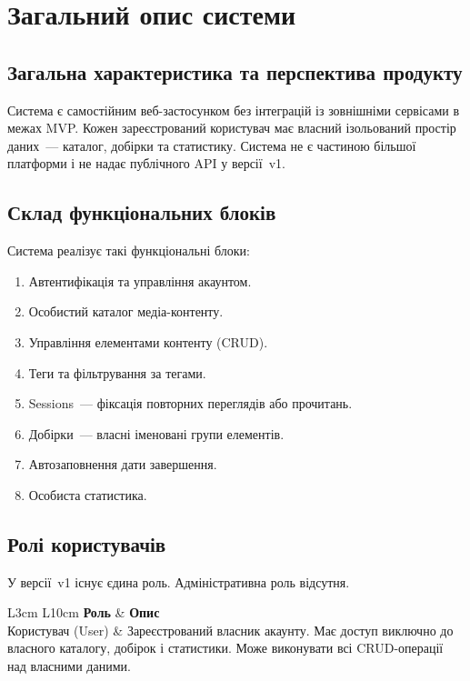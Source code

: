 \section{Загальний опис системи}
\label{sec:zahalnyi-opys}

\subsection{Загальна характеристика та перспектива продукту}

Система є самостійним веб-застосунком без інтеграцій із зовнішніми сервісами в межах MVP. Кожен зареєстрований користувач має власний ізольований простір даних~--- каталог, добірки та статистику. Система не є частиною більшої платформи і не надає публічного API у версії~v1. 

\subsection{Склад функціональних блоків}

Система реалізує такі функціональні блоки:
\begin{enumerate}
  \item Автентифікація та управління акаунтом.
  \item Особистий каталог медіа-контенту.
  \item Управління елементами контенту (CRUD).
  \item Теги та фільтрування за тегами.
  \item Sessions~--- фіксація повторних переглядів або прочитань.
  \item Добірки~--- власні іменовані групи елементів.
  \item Автозаповнення дати завершення.
  \item Особиста статистика.
\end{enumerate}

\subsection{Ролі користувачів}

У версії~v1 існує єдина роль. Адміністративна роль відсутня.

\begin{table}[h]
\caption{Ролі користувачів системи}
\label{tab:roli}
\begin{tabular}{L{3cm} L{10cm}}
\toprule
\textbf{Роль} & \textbf{Опис} \\
\midrule
Користувач (User) & Зареєстрований власник акаунту. Має доступ виключно до власного каталогу, добірок і статистики. Може виконувати всі CRUD-операції над власними даними. \\
\bottomrule
\end{tabular}
\end{table}

